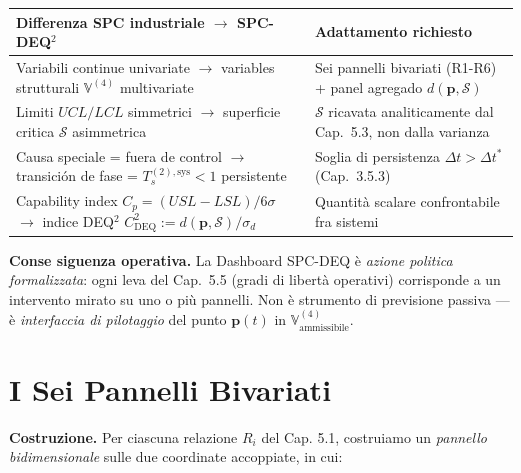 {\def\LTcaptype{none} %
{\small\begin{longtable}[]{@{}
  >{\raggedright\arraybackslash}p{}
  >{\raggedright\arraybackslash}p{}@{}}
\toprule\noalign{}
\begin{minipage}[b]{\linewidth}\raggedright
Differenza SPC industriale $\to$ SPC-DEQ$^2$
\end{minipage} & \begin{minipage}[b]{\linewidth}\raggedright
Adattamento richiesto
\end{minipage} \\
\midrule\noalign{}
\endhead
\bottomrule\noalign{}
\endlastfoot
Variabili continue univariate $\to$ variables strutturali
\(\mathbb{V}^{(4)}\) multivariate & Sei pannelli bivariati (R1-R6) +
panel agregado \(d(\boldsymbol{p}, \mathcal{S})\) \\
Limiti \(UCL/LCL\) simmetrici $\to$ superficie critica \(\mathcal{S}\)
asimmetrica & \(\mathcal{S}\) ricavata analiticamente dal Cap.~5.3, non
dalla varianza \\
Causa speciale = fuera de control $\to$ transición de fase =
\(T_s^{(2),\text{sys}} < 1\) persistente & Soglia di persistenza
\(\Delta t > \Delta t^*\) (Cap.~3.5.3) \\
Capability index \(C_p = (USL-LSL)/6\sigma\) $\to$ indice DEQ$^2$
\(C_{\text{DEQ}}^2 := d(\boldsymbol{p}, \mathcal{S}) / \sigma_d\) &
Quantità scalare confrontabile fra sistemi \\
\end{longtable}}
}

\Proved{} \textbf{Conse siguenza operativa.} La Dashboard SPC-DEQ è
\emph{azione politica formalizzata}: ogni leva del Cap.~5.5 (gradi di
libertà operativi) corrisponde a un intervento mirato su uno o più
pannelli. Non è strumento di previsione passiva --- è \emph{interfaccia
di pilotaggio} del punto \(\boldsymbol{p}(t)\) in
\(\mathbb{V}^{(4)}_{\text{ammissibile}}\).



\section{I Sei Pannelli Bivariati}\label{i-sei-pannelli-bivariati}

\Hypoth{} \textbf{Costruzione.} Per ciascuna relazione \(R_i\) del Cap.
5.1, costruiamo un \emph{pannello bidimensionale} sulle due coordinate
accoppiate, in cui:

